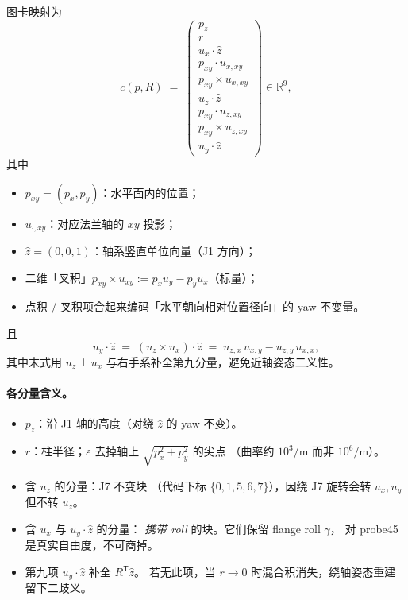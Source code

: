 \documentclass[UTF8,a4paper,11pt,fontset=fandol]{ctexart}
\newcommand{\R}{\mathbb{R}}
\begin{document}
图卡映射为
\begin{equation}
\label{eq:chart}
  c(p,R)
  \;=\;
  \begin{pmatrix}
    p_{z}\\
    r\\
    u_{x}\!\cdot\!\hat z\\
    p_{xy}\!\cdot\! u_{x,xy}\\
    p_{xy}\!\times\! u_{x,xy}\\
    u_{z}\!\cdot\!\hat z\\
    p_{xy}\!\cdot\! u_{z,xy}\\
    p_{xy}\!\times\! u_{z,xy}\\
    u_{y}\!\cdot\!\hat z
  \end{pmatrix}
  \in\R^{9},
\end{equation}
其中
\begin{itemize}[leftmargin=1.4em]
  \item \(p_{xy}=(p_{x},p_{y})\)：水平面内的位置；
  \item \(u_{\cdot,xy}\)：对应法兰轴的 \(xy\) 投影；
  \item \(\hat z=(0,0,1)\)：轴系竖直单位向量（J1 方向）；
  \item 二维「叉积」\(p_{xy}\times u_{xy}:=p_{x}u_{y}-p_{y}u_{x}\)（标量）；
  \item 点积 / 叉积项合起来编码「水平朝向相对位置径向」的 yaw 不变量。
\end{itemize}
且
\begin{equation}
\label{eq:uyz}
  u_{y}\!\cdot\!\hat z
  \;=\;
  (u_{z}\times u_{x})\!\cdot\!\hat z
  \;=\;
  u_{z,x}\,u_{x,y}-u_{z,y}\,u_{x,x},
\end{equation}
其中末式用 \(u_{z}\perp u_{x}\) 与右手系补全第九分量，避免近轴姿态二义性。

\paragraph{各分量含义。}
\begin{itemize}[leftmargin=1.4em]
  \item \(p_{z}\)：沿 J1 轴的高度（对绕 \(\hat z\) 的 yaw 不变）。
  \item \(r\)：柱半径；\(\varepsilon\) 去掉轴上
        \(\sqrt{p_{x}^{2}+p_{y}^{2}}\) 的尖点
        （曲率约 \(10^{3}/\mathrm{m}\) 而非 \(10^{6}/\mathrm{m}\)）。
  \item 含 \(u_{z}\) 的分量：J7 不变块
        （代码下标 \(\{0,1,5,6,7\}\)），因绕 J7 旋转会转 \(u_{x},u_{y}\)
        但不转 \(u_{z}\)。
  \item 含 \(u_{x}\) 与 \(u_{y}\!\cdot\!\hat z\) 的分量：
        \emph{携带 roll} 的块。它们保留 flange roll \(\gamma\)，
        对 probe45 是真实自由度，不可商掉。
  \item 第九项 \(u_{y}\!\cdot\!\hat z\) 补全 \(R^{\mathsf T}\hat z\)。
        若无此项，当 \(r\to 0\) 时混合积消失，绕轴姿态重建留下二歧义。
\end{itemize}
\end{document}
